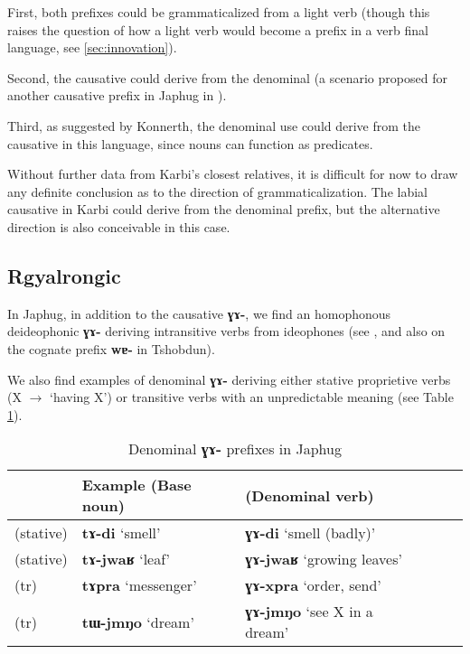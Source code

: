 \documentclass[oneside,a4paper,11pt]{article}
\newcommand{\ipa}[1]{\textbf{{\phon\mbox{#1}}}} %
\newcommand{\forme}[2]{\ipa{#1} `#2'}
\begin{document}
First, both prefixes could be grammaticalized from a light verb (though this raises the question of how a light verb would become a prefix in a verb final language, see \ref{sec:innovation}). 

Second, the causative could derive from the denominal (a scenario proposed for another causative prefix in Japhug in \citealt{jacques15causative}). 

Third, as suggested by Konnerth, the denominal use could derive from the causative in this language, since nouns can function as predicates.

Without further data from Karbi's closest relatives, it is difficult for now to draw any definite conclusion as to the direction of grammaticalization. The labial causative in Karbi could derive from the denominal prefix, but the alternative direction is also conceivable in this case.

\subsection{Rgyalrongic} \label{sec:rgyalrong.denom}
In Japhug, in addition to the causative \ipa{ɣɤ-}, we find an homophonous deideophonic \ipa{ɣɤ-} deriving intransitive verbs from ideophones (see \citealt{japhug14ideophones}, and also \citealt{jackson04zhuangmaoci, jackson14morpho} on the cognate prefix \ipa{wɐ-} in Tshobdun).

We also find examples of denominal \ipa{ɣɤ-} deriving either stative proprietive verbs (X $\rightarrow$ `having X') or transitive verbs with an unpredictable meaning (see Table \ref{tab:denominal.GA}).

\begin{table}[H]
\caption{Denominal \ipa{ɣɤ-} prefixes in Japhug} \label{tab:denominal.GA} \centering
\begin{tabular}{llllll}
\toprule
 & Example (Base noun) & (Denominal verb)\\
\midrule
(stative)& \forme{tɤ-di}{smell} & \forme{ɣɤ-di}{smell (badly)} \\
(stative) & \forme{tɤ-jwaʁ}{leaf} & \forme{ɣɤ-jwaʁ}{growing leaves} \\
\midrule
(tr) & \forme{tɤpra}{messenger} & \forme{ɣɤ-xpra}{order, send} \\
(tr) & \forme{tɯ-jmŋo}{dream} & \forme{ɣɤ-jmŋo}{see X in a dream} \\
\bottomrule
\end{tabular}
\end{table}
\end{document}
